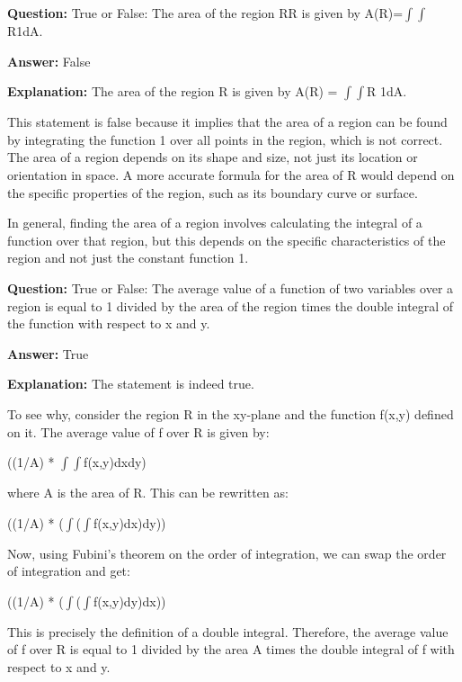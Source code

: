 \documentclass{article}
\begin{document}
                \vspace{0.5cm} 
        
            
                \textbf {Question:} True or False: The area of the region RR is given by A(R)=\ensuremath{\int}\ensuremath{\int}R1dA.
                
                \textbf{Answer:} False

                \textbf{Explanation:} The area of the region R is given by A(R) = \ensuremath{\int}\ensuremath{\int}R 1dA.

This statement is false because it implies that the area of a region can be found by integrating the function 1 over all points in the region, which is not correct. The area of a region depends on its shape and size, not just its location or orientation in space. A more accurate formula for the area of R would depend on the specific properties of the region, such as its boundary curve or surface.

In general, finding the area of a region involves calculating the integral of a function over that region, but this depends on the specific characteristics of the region and not just the constant function 1.
                
                \vspace{0.5cm} 
        
            
                \textbf {Question:} True or False: The average value of a function of two variables over a region is equal to 1 divided by the area of the region times the double integral of the function with respect to x and y.
                
                \textbf{Answer:} True

                \textbf{Explanation:} The statement is indeed true.

To see why, consider the region R in the xy-plane and the function f(x,y) defined on it. The average value of f over R is given by:

((1/A) * \ensuremath{\int}\ensuremath{\int}f(x,y)dxdy)

where A is the area of R. This can be rewritten as:

((1/A) * (\ensuremath{\int}(\ensuremath{\int}f(x,y)dx)dy))

Now, using Fubini's theorem on the order of integration, we can swap the order of integration and get:

((1/A) * (\ensuremath{\int}(\ensuremath{\int}f(x,y)dy)dx))

This is precisely the definition of a double integral. Therefore, the average value of f over R is equal to 1 divided by the area A times the double integral of f with respect to x and y.
                
\end{document}

